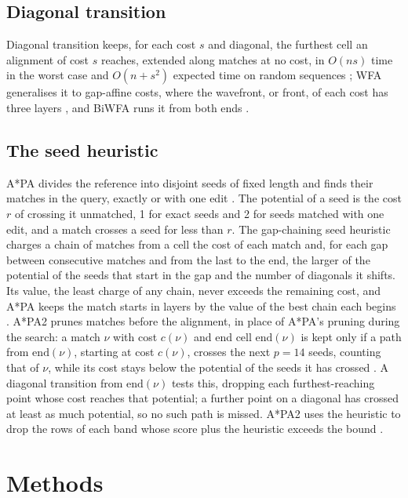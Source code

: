\documentclass[nocrop,noinfo]{bioinfo}
\begin{document}
\subsection{Diagonal transition}

Diagonal transition keeps, for each cost \(s\) and diagonal, the furthest cell an alignment of cost \(s\) reaches, extended along matches at no cost, in \(O(ns)\) time in the worst case and \(O(n + s^2)\) expected time on random sequences \citep{Ukkonen1985,Myers1986ond}; WFA generalises it to gap-affine costs, where the wavefront, or front, of each cost has three layers \citep{MarcoSola2021wfa}, and BiWFA runs it from both ends \citep{MarcoSola2023biwfa}.

\subsection{The seed heuristic}

A*PA divides the reference into disjoint seeds of fixed length and finds their matches in the query, exactly or with one edit \citep{GrootKoerkamp2024astarpa}. The potential of a seed is the cost \(r\) of crossing it unmatched, 1 for exact seeds and 2 for seeds matched with one edit, and a match crosses a seed for less than \(r\). The gap-chaining seed heuristic charges a chain of matches from a cell the cost of each match and, for each gap between consecutive matches and from the last to the end, the larger of the potential of the seeds that start in the gap and the number of diagonals it shifts. Its value, the least charge of any chain, never exceeds the remaining cost, and A*PA keeps the match starts in layers by the value of the best chain each begins \citep{GrootKoerkamp2024astarpa}. A*PA2 prunes matches before the alignment, in place of A*PA's pruning during the search: a match \(\nu\) with cost \(c(\nu)\) and end cell \(\mathrm{end}(\nu)\) is kept only if a path from \(\mathrm{end}(\nu)\), starting at cost \(c(\nu)\), crosses the next \(p = 14\) seeds, counting that of \(\nu\), while its cost stays below the potential of the seeds it has crossed \citep{GrootKoerkamp2024astarpa2}. A diagonal transition from \(\mathrm{end}(\nu)\) tests this, dropping each furthest-reaching point whose cost reaches that potential; a further point on a diagonal has crossed at least as much potential, so no such path is missed. A*PA2 uses the heuristic to drop the rows of each band whose score plus the heuristic exceeds the bound \citep{GrootKoerkamp2024astarpa2}.

\section{Methods}
\end{document}

